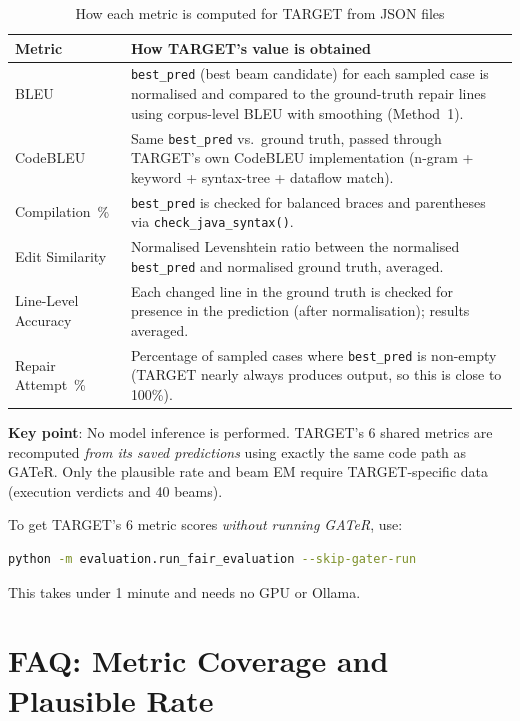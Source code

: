 \documentclass[11pt,a4paper]{article}
\begin{document}
\begin{table}[h]
\centering
\caption{How each metric is computed for TARGET from JSON files}
\renewcommand{\arraystretch}{1.3}
\begin{tabular}{@{}p{3.2cm}p{10cm}@{}}
\toprule
\textbf{Metric} & \textbf{How TARGET's value is obtained} \\
\midrule
BLEU
    & \texttt{best\_pred} (best beam candidate) for each sampled case is
      normalised and compared to the ground-truth repair lines using
      corpus-level BLEU with smoothing (Method~1). \\
CodeBLEU
    & Same \texttt{best\_pred} vs.\ ground truth, passed through
      TARGET's own CodeBLEU implementation (n-gram + keyword +
      syntax-tree + dataflow match). \\
Compilation~\%
    & \texttt{best\_pred} is checked for balanced braces and
      parentheses via \texttt{check\_java\_syntax()}. \\
Edit Similarity
    & Normalised Levenshtein ratio between the normalised
      \texttt{best\_pred} and normalised ground truth, averaged. \\
Line-Level Accuracy
    & Each changed line in the ground truth is checked for presence
      in the prediction (after normalisation); results averaged. \\
Repair Attempt~\%
    & Percentage of sampled cases where \texttt{best\_pred} is
      non-empty (TARGET nearly always produces output, so this is
      close to 100\%). \\
\bottomrule
\end{tabular}
\end{table}

\textbf{Key point}: No model inference is performed. TARGET's 6 shared
metrics are recomputed \emph{from its saved predictions} using exactly
the same code path as GATeR. Only the plausible rate and beam EM
require TARGET-specific data (execution verdicts and 40 beams).

To get TARGET's 6 metric scores \emph{without running GATeR}, use:
\begin{lstlisting}[language=bash]
python -m evaluation.run_fair_evaluation --skip-gater-run
\end{lstlisting}
This takes under 1 minute and needs no GPU or Ollama.

\section{FAQ: Metric Coverage and Plausible Rate}
\label{sec:faq}
\end{document}
